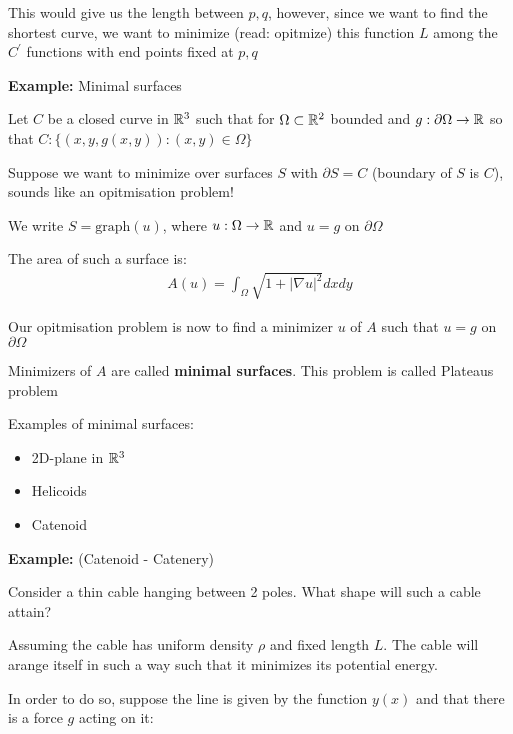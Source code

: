 \par\bigskip
\noindent This would give us the length between $p,q$, however, since we want to find the shortest curve, we want to minimize (read: opitmize) this function $L$ among the $C^{\prime}$ functions with end points fixed at $p,q$
\par\bigskip
\noindent\textbf{Example:} Minimal surfaces
\par\bigskip
\noindent Let $C$ be a closed curve in $\mathbb{R}^3$ such that for $\Omega\subset\mathbb{R}^2$ bounded and $g:\partial\Omega\to\mathbb{R}$ so that $C:\{(x,y,g(x,y)):(x,y)\in\Omega\}$
\par\bigskip
\noindent Suppose we want to minimize over surfaces $S$ with $\partial S = C$ (boundary of $S$ is $C$), sounds like an opitmisation problem!\par
\noindent We write $S = \text{graph}(u)$, where $u:\Omega\to\mathbb{R}$ and $u = g$ on $\partial\Omega$
\par\bigskip
\noindent The area of such a surface is:
\begin{equation*}
  \begin{gathered}
    A(u) = \int_{\Omega}\sqrt{1+\left|\nabla u\right|^2}dxdy
  \end{gathered}
\end{equation*}
\par\bigskip
\noindent Our opitmisation problem is now to find a minimizer $u$ of $A$ such that $u=g$ on $\partial\Omega$
\par\bigskip
\noindent Minimizers of $A$ are called \textbf{minimal surfaces}. This problem is called Plateaus problem
\par\bigskip
\noindent Examples of minimal surfaces:
\begin{itemize}
  \item 2D-plane in $\mathbb{R}^3$
  \item Helicoids
  \item Catenoid
\end{itemize}
\par\bigskip
\noindent\textbf{Example:} (Catenoid - Catenery)
\par\bigskip
\noindent Consider a thin cable hanging between 2 poles. What shape will such a cable attain?\par
\noindent Assuming the cable has uniform density $\rho$ and fixed length $L$. The cable will arange itself in such a way such that it minimizes its potential energy.\par
\noindent In order to do so, suppose the line is given by the function $y(x)$ and that there is a force $g$ acting on it:
